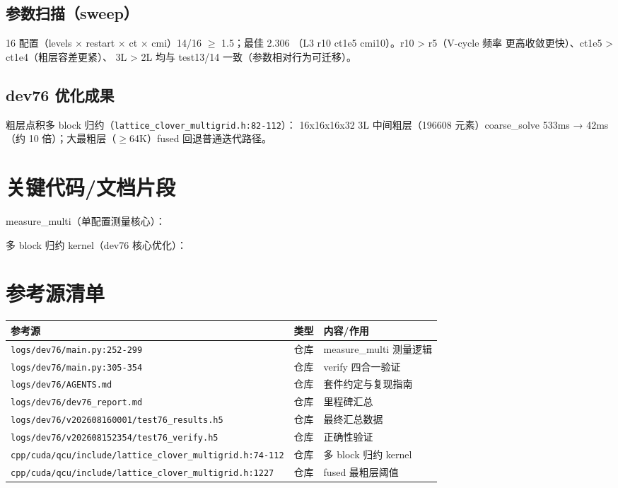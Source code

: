 \documentclass[UTF8]{ctexart}
\begin{document}
\subsection{参数扫描（sweep）}
16 配置（levels × restart × ct × cmi）14/16 $\ge$ 1.5；最佳 2.306
（L3 r10 ct1e5 cmi10）。\textcolor{relation}{r10 > r5}（V-cycle 频率
更高收敛更快）、\textcolor{relation}{ct1e5 > ct1e4}（粗层容差更紧）、
\textcolor{relation}{3L > 2L} 均与 test13/14 一致（参数相对行为可迁移）。

\subsection{dev76 优化成果}
粗层点积多 block 归约（\texttt{lattice\_clover\_multigrid.h:82-112}）：
16x16x16x32 3L 中间粗层（196608 元素）coarse\_solve 533ms → 42ms
（约 10 倍）；大最粗层（$\ge$64K）fused 回退普通迭代路径。

\section{关键代码/文档片段}
measure\_multi（单配置测量核心）：


多 block 归约 kernel（dev76 核心优化）：


\section{参考源清单}
\begin{xltabular}{\textwidth}{llX}
\toprule
\textcolor{evidence}{参考源} & 类型 & 内容/作用 \\
\midrule
\endhead
\texttt{\nolinkurl{logs/dev76/main.py:252-299}} & 仓库 & measure\_multi 测量逻辑 \\
\texttt{\nolinkurl{logs/dev76/main.py:305-354}} & 仓库 & verify 四合一验证 \\
\texttt{\nolinkurl{logs/dev76/AGENTS.md}} & 仓库 & 套件约定与复现指南 \\
\texttt{\nolinkurl{logs/dev76/dev76_report.md}} & 仓库 & 里程碑汇总 \\
\texttt{\nolinkurl{logs/dev76/v202608160001/test76_results.h5}} & 仓库 & 最终汇总数据 \\
\texttt{\nolinkurl{logs/dev76/v202608152354/test76_verify.h5}} & 仓库 & 正确性验证 \\
\texttt{\nolinkurl{cpp/cuda/qcu/include/lattice_clover_multigrid.h:74-112}} & 仓库 & 多 block 归约 kernel \\
\texttt{\nolinkurl{cpp/cuda/qcu/include/lattice_clover_multigrid.h:1227}} & 仓库 & fused 最粗层阈值 \\
\bottomrule
\end{xltabular}
\end{document}
